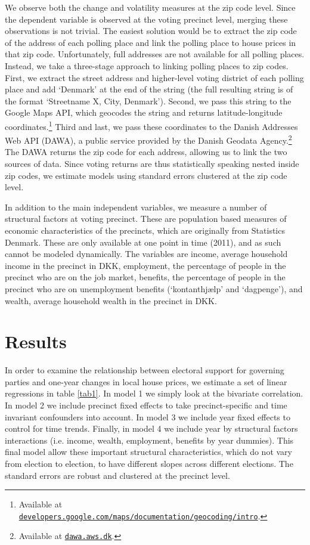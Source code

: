 \documentclass[12pt,a4paper]{article}
\begin{document}
We observe both the change and volatility measures at the zip code level. Since the dependent variable is observed at the voting precinct level, merging these observations is not trivial. The easiest solution would be to extract the zip code of the address of each polling place and link the polling place to house prices in that zip code. Unfortunately, full addresses are not available for all polling places. Instead, we take a three-stage approach to linking polling places to zip codes. First, we extract the street address and higher-level voting district of each polling place and add `Denmark' at the end of the string (the full resulting string is of the format `Streetname X, City, Denmark'). Second, we pass this string to the Google Maps API, which geocodes the string and returns latitude-longitude coordinates.\footnote{Available at \texttt{\href{https://developers.google.com/maps/documentation/geocoding/intro}{developers.google.com/maps/documentation/geocoding/intro}}.} Third and last, we pass these coordinates to the Danish Addresses Web API (DAWA), a public service provided by the Danish Geodata Agency.\footnote{Available at \texttt{\href{http://dawa.aws.dk/}{dawa.aws.dk}}.} The DAWA returns the zip code for each address, allowing us to link the two sources of data. Since voting returns are thus statistically speaking nested inside zip codes, we estimate models using standard errors clustered at the zip code level.

In addition to the main independent variables, we measure a number of structural factors at voting precinct. These are population based measures of economic characteristics of the precincts, which are originally from Statistics Denmark. These are only available at one point in time (2011), and as such cannot be modeled dynamically. The variables are income, average household income in the precinct in DKK, employment, the percentage of people in the precinct who are on the job market, benefits, the percentage of people in the precinct who are on unemployment benefits (`kontanthjælp' and `dagpenge'), and wealth, average household wealth in the precinct in DKK.  


\section{Results}
In order to examine the relationship between electoral support for governing parties and one-year changes in local house prices, we estimate a set of linear regressions in table \ref{tab1}. In model 1 we simply look at the bivariate correlation. In model 2 we include precinct fixed effects to take precinct-specific and time invariant confounders into account. In model 3 we include year fixed effects to control for time trends. Finally, in model 4 we include year by structural factors interactions (i.e. income, wealth, employment, benefits by year dummies). This final model allow these important structural characteristics, which do not vary from election to election, to have different slopes across different elections. The standard errors are robust and clustered at the precinct level.
\end{document}
